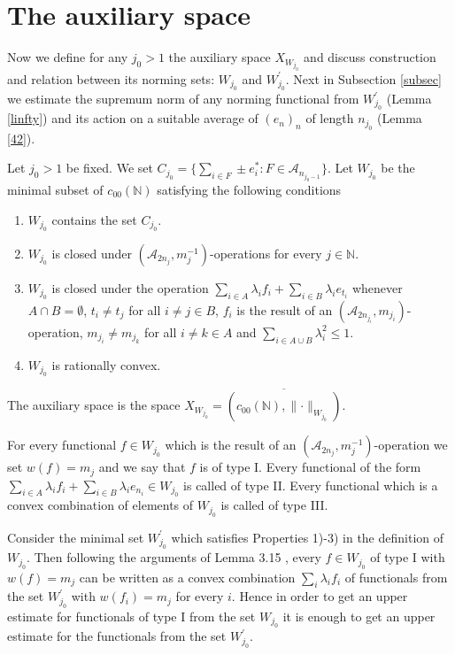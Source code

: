\documentclass[a4paper]{amsart}
\theoremstyle{plain}
\newcommand{\N}{\mathbb{N}}
\newcommand{\mc}{\mathcal}
\newcommand{\mca}[1][A]{\mathcal{#1}}
\newcommand{\norm}[1][\cdot]{\lVert #1\rVert}
\begin{document}
\section{The auxiliary space}\label{sec8}
Now we define for any $j_0>1$ the auxiliary space $X_{W_{j_0}}$ and discuss construction
and relation between its norming sets: $W_{j_0}$ and $W_{j_0}^{\prime}$. Next in Subsection
\ref{subsec} we estimate the supremum norm of any norming functional from $W_{j_0}^{\prime}$
(Lemma \ref{linfty}) and its action on a suitable average of $(e_n)_n$ of length $n_{j_0}$  (Lemma \ref{42}).

Let $j_0>1$ be fixed. We set $C_{j_0}=\{\sum_{i\in F}\pm e_{i}^{*}: F\in\mc{A}_{n_{j_0-1}}\}$.
Let $W_{j_0}$ be the minimal subset of $c_{00}(\N)$ satisfying the following conditions
\begin{enumerate}
\item[1)] $W_{j_0}$ contains the set  $C_{j_0}$.
\item[2)] $W_{j_0}$ is closed under
$(\mca_{2n_j}, m_{j}^{-1})$-operations for every $j\in\N$.
\item[3)] $W_{j_0}$ is closed under the operation $\sum_{i\in A}\lambda_{i}f_{i}+\sum_{i\in
B}\lambda_{i}e_{t_i}$ whenever  $A\cap B=\emptyset$, $t_i\ne
t_{j}$ for all $i\ne j\in B$, $f_{i}$ is the result of an
$(\mca_{2n_{j_i}}, m_{j_i})$-operation,  $m_{j_i}\ne m_{j_k}$ for all
$i\ne k\in A$ and  $\sum_{i\in A\cup B}\lambda_{i}^{2}\leq 1$.
\item[4)] $W_{j_0}$ is rationally convex.
\end{enumerate}
The auxiliary space is  the space $X_{W_{j_0}}=\overline{(c_{00}(\N),\norm_{W_{j_0}})}$.

For every functional $f\in W_{j_0}$ which is the result of an $(\mca_{2n_j},
m_{j}^{-1})$-operation we set $w(f)=m_{j}$ and we say that $f$ is of type I. Every
functional of the form $\sum_{i\in A}\lambda_{i}f_{i}+\sum_{i\in B}\lambda_{i}e_{n_i}\in
W_{j_0}$ is called of type II. Every functional which is a convex combination of elements
of $W_{j_0}$ is called of type III.


Consider the minimal set $W_{j_0}^{\prime}$ which satisfies Properties 1)-3) in the
definition of $W_{j_0}$. Then following the arguments of Lemma 3.15 \cite{ATo}, every
$f\in W_{j_0}$ of type I with $w(f)=m_{j}$  can be written as a convex combination
$\sum_{i}\lambda_{i}f_{i}$ of functionals  from the set  $W_{j_0}^{\prime}$ with
$w(f_{i})=m_{j}$ for every $i$. Hence  in order to get an upper estimate for functionals
of type I from the set  $W_{j_0}$ it is enough to get an upper estimate for the
functionals from the set $W_{j_0}^{\prime}$.
\end{document}
